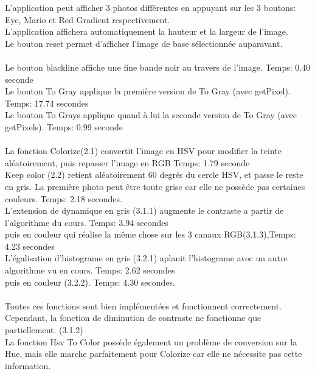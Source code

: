 \documentclass[12pt]{article}
\begin{document}
L'application peut afficher 3 photos différentes en appuyant sur les 3 boutons: Eye, Mario et Red Gradient respectivement.\\
L'application affichera automatiquement la hauteur et la largeur de l'image.\\
Le bouton reset permet d'afficher l'image de base sélectionnée auparavant.\\
\\
Le bouton blackline affiche une fine bande noir au travers de l'image. Temps: 0.40 seconde\\
Le bouton To Gray applique la première version de To Gray (avec getPixel). Temps: 17.74 secondes\\
Le bouton To Grays applique quand à lui la seconde version de To Gray (avec getPixels). Temps: 0.99 seconde \\
\\
La fonction Colorize(2.1) convertit l'image en HSV pour modifier la teinte aléatoirement, puis repasser l'image en RGB Temps: 1.79 seconde\\
Keep color (2.2) retient aléatoirement 60 degrés du cercle HSV, et passe le reste en gris. La première photo peut être toute grise car elle ne possède pas certaines couleurs. Temps: 2.18 secondes.\\
L'extension de dynamique en gris (3.1.1) augmente le contraste a partir de l'algorithme du cours. Temps: 3.94 secondes\\
puis en couleur qui réalise la même chose sur les 3 canaux RGB(3.1.3),Temps: 4.23 secondes\\
L'égalisation d'histograme en gris (3.2.1) aplanit l'histograme avec un autre algorithme vu en cours. Temps: 2.62 secondes\\
puis en couleur (3.2.2). Temps: 4.30 secondes.\\
\\
Toutes ces fonctions sont bien implémentées et fonctionnent correctement.
\\
Cependant, la fonction de diminution de contraste ne fonctionne que partiellement. (3.1.2)\\
La fonction Hsv To Color possède également un problème de conversion sur la Hue, mais elle marche parfaitement pour Colorize car elle ne nécessite pas cette information.\\
\end{document}
